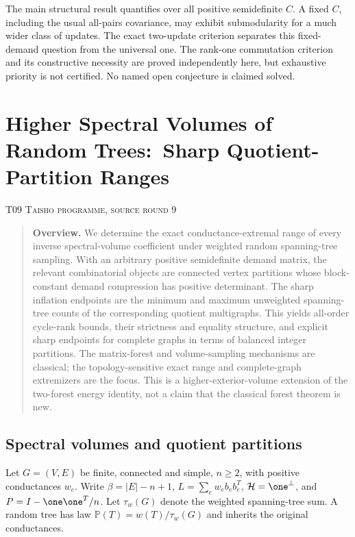 \documentclass[11pt,a4paper]{article}
\theoremstyle{definition}\newtheorem{definition}[theorem]{Definition}
\theoremstyle{remark}\newtheorem{remark}[theorem]{Remark}
\numberwithin{equation}{section}
\begin{document}
The main structural result quantifies over all positive semidefinite $C$. A fixed $C$, including the usual all-pairs covariance, may exhibit submodularity for a much wider class of updates. The exact two-update criterion separates this fixed-demand question from the universal one. The rank-one commutation criterion and its constructive necessity are proved independently here, but exhaustive priority is not certified. No named open conjecture is claimed solved.





\clearpage
\section[T09 --- Higher Spectral Volumes of Random Trees:\ Sharp Quotient-Partition Ranges]{Higher Spectral Volumes of Random Trees:\ Sharp Quotient-Partition Ranges}\label{contrib-T09}
\noindent\textsc{T09 \quad Taisho programme, source round 9}\par\medskip



\begin{quote}\small\textbf{Overview.} We determine the exact conductance-extremal range of every inverse spectral-volume coefficient under weighted random spanning-tree sampling. With an arbitrary positive semidefinite demand matrix, the relevant combinatorial objects are connected vertex partitions whose block-constant demand compression has positive determinant. The sharp inflation endpoints are the minimum and maximum unweighted spanning-tree counts of the corresponding quotient multigraphs. This yields all-order cycle-rank bounds, their strictness and equality structure, and explicit sharp endpoints for complete graphs in terms of balanced integer partitions. The matrix-forest and volume-sampling mechanisms are classical; the topology-sensitive exact range and complete-graph extremizers are the focus. This is a higher-exterior-volume extension of the two-forest energy identity, not a claim that the classical forest theorem is new.\end{quote}
\subsection{Spectral volumes and quotient partitions}\label{T09-sec-1}
Let $G=(V,E)$ be finite, connected and simple, $n\ge2$, with positive conductances $w_e$. Write $\beta=|E|-n+1$, $L=\sum_e w_e b_e b_e^T$, $\mathcal H=\one^\perp$, and $P=I-\one\one^T/n$. Let $\tau_w(G)$ denote the weighted spanning-tree sum. A random tree has law $\mathbb P(T)=w(T)/\tau_w(G)$ and inherits the original conductances.
\end{document}
